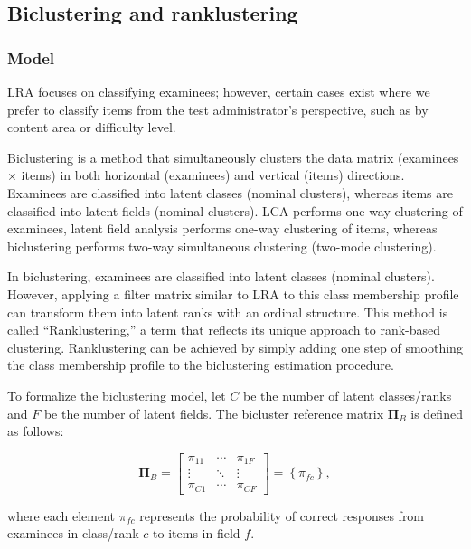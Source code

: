 \subsection{Biclustering and ranklustering}\label{biclustering-and-ranklustering}

\subsubsection{Model}\label{model-1}

LRA focuses on classifying examinees; however, certain cases exist where we prefer to classify items from the test administrator's perspective, such as by content area or difficulty level.

Biclustering is a method that simultaneously clusters the data matrix (examinees \(\times\) items) in both horizontal (examinees) and vertical (items) directions. Examinees are classified into latent classes (nominal clusters), whereas items are classified into latent fields (nominal clusters). LCA performs one-way clustering of examinees, latent field analysis performs one-way clustering of items, whereas biclustering performs two-way simultaneous clustering (two-mode clustering).

In biclustering, examinees are classified into latent classes (nominal clusters). However, applying a filter matrix similar to LRA to this class membership profile can transform them into latent ranks with an ordinal structure. This method is called ``Ranklustering,'' a term that reflects its unique approach to rank-based clustering. Ranklustering can be achieved by simply adding one step of smoothing the class membership profile to the biclustering estimation procedure.

To formalize the biclustering model, let \(C\) be the number of latent classes/ranks and \(F\) be the number of latent fields. The bicluster reference matrix \(\boldsymbol{\Pi}_B\) is defined as follows:

\[
\boldsymbol{\Pi}_B=\left[\begin{array}{ccc}
\pi_{11} & \cdots & \pi_{1F} \\
\vdots & \ddots & \vdots \\
\pi_{C1} & \cdots & \pi_{CF}
\end{array}\right]=\left\{\pi_{fc}\right\},
\]

\noindent where each element \(\pi_{fc}\) represents the probability of correct responses from examinees in class/rank \(c\) to items in field \(f\).

